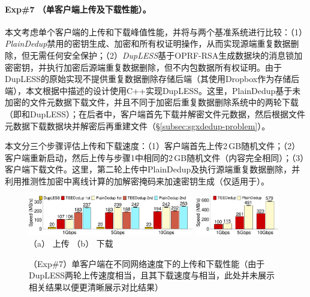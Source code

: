 \paragraph*{Exp\#7 （单客户端上传及下载性能）。}本文考虑单个客户端的上传和下载峰值性能，并将\sysnameS 与两个基准系统进行比较：（1）\textit{PlainDedup}禁用\sysnameS 的密钥生成、加密和所有权证明操作，从而实现源端重复数据删除，但无需任何安全保护；（2）\textit{DupLESS}\cite{bellare2013DupLESS}基于OPRF-RSA生成数据块的消息锁加密密钥，并执行加密后源端重复数据删除，但不内包数据所有权证明。由于DupLESS的原始实现不提供重复数据删除存储后端（其使用Dropbox作为存储后端），本文根据\cite{bellare2013DupLESS}中描述的设计使用C++实现DupLESS。这里，PlainDedup基于未加密的文件元数据下载文件，并且不同于加密后重复数据删除系统中的两轮下载（即\sysnameS 和DupLESS）；在后者中，客户端首先下载并解密文件元数据，然后根据文件元数据下载数据块并解密后再重建文件（\S\ref{subsec:sgxdedup-problem}）。

本文分三个步骤评估上传和下载速度：（1）客户端首先上传2\,GB随机文件；（2）客户端重新启动，然后上传与步骤1中相同的2\,GB随机文件（内容完全相同）；（3）客户端下载文件。这里，第二轮上传中PlainDedup及\sysnameS 执行源端重复数据删除，并利用推测性加密中离线计算的加解密掩码来加速密钥生成（仅适用于\sysnameS）。

\begin{figure}[!htb]
    \centering
    \includegraphics[width=0.646\textwidth]{pic/sgxdedup/upload_network_speed_bar.pdf} 
    \includegraphics[width=0.324\textwidth]{pic/sgxdedup/download_network_speed_bar.pdf}
    \\
      \hspace{1.1in} {\small （a） 上传} \hspace{1.9in}
    {\small （b） 下载}\\
    \caption{（Exp\#7）单客户端在不同网络速度下的上传和下载性能（由于DupLESS两轮上传速度相当，且其下载速度与\sysnameS 相当，此处并未展示相关结果以便更清晰展示对比结果）}
    \label{fig:sgxdedup-singleClientThroughput}
\end{figure}

